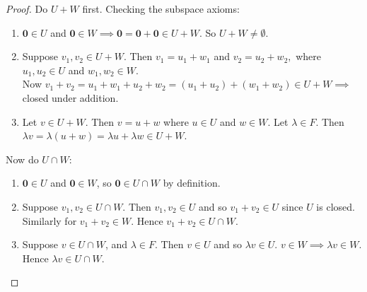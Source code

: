 \begin{proof}
Do $U+W$ first. Checking the subspace axioms:
\begin{enumerate}
\item  $\mathbf{0} \in U$ and $\mathbf{0} \in W \implies \mathbf{0} = \mathbf{0} + \mathbf{0} \in U + W$. So $U + W \neq \emptyset$. 
\item Suppose $v_1, v_2 \in U + W$. Then $v_1 = u_1 + w_1$ and $v_2 = u_2 + w_2,$ where $u_1,u_2 \in U$ and $w_1, w_2 \in W$.\\

Now $v_1 + v_2 = u_1 + w_1 + u_2 + w_2 = (u_1 + u_2) + (w_1 + w_2) \in U + W \implies$ closed under addition.

\item Let $v \in U + W$. Then $v = u + w$ where $u \in U$ and $w \in W.$ Let $\lambda \in F$. Then $\lambda v = \lambda(u+w) = \lambda u + \lambda w \in U + W$.
\end{enumerate}

Now do $U \cap W$:
\begin{enumerate}
\item $\mathbf{0} \in U$ and $\mathbf{0} \in W$, so $\mathbf{0} \in U \cap W$ by definition.
\item Suppose $v_1, v_2 \in U \cap W.$ Then $v_1, v_2 \in U$ and so $v_1 + v_2 \in U$ since $U$ is closed. Similarly for $v_1 + v_2 \in W$. Hence $v_1 + v_2 \in U \cap W$. 
\item Suppose $v \in U \cap W$, and $\lambda \in F.$ Then $v \in U$ and so $\lambda v \in U$. $v \in W \implies \lambda v \in W.$ Hence $\lambda v \in U \cap W$.\qedhere 
\end{enumerate}
\end{proof}\vspace*{10pt}

